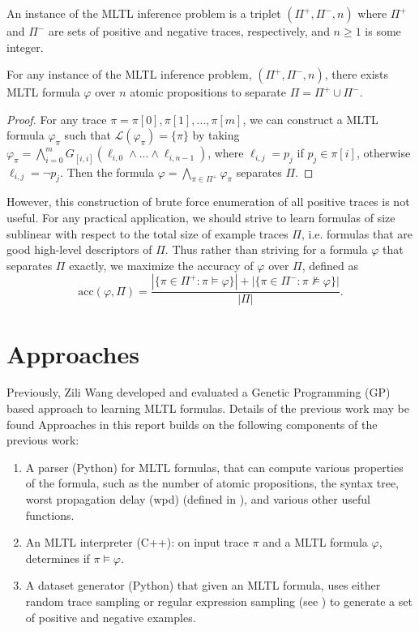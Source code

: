 \documentclass[runningheads]{llncs}
\renewcommand{\phi}{\varphi}
\begin{document}
\begin{definition}
    An instance of the MLTL inference problem is a triplet $(\Pi^+, \Pi^-, n)$ where $\Pi^+$ and $\Pi^-$ are sets of positive and negative traces, respectively, and $n \geq 1$ is some integer. 
\end{definition}
\begin{theorem}
    For any instance of the MLTL inference problem, $(\Pi^+, \Pi^-, n)$, there exists MLTL formula $\phi$ over $n$ atomic propositions to separate $\Pi = \Pi^+ \cup \Pi^-$. 
\end{theorem}
\begin{proof}
    For any trace $\pi = \pi[0],\pi[1],...,\pi[m]$, we can construct a MLTL formula $\phi_\pi$ such that $\mathcal{L}(\phi_\pi) = \{\pi\}$ by taking  $\phi_\pi = \bigwedge_{i = 0}^{m} G_{[i, i]}(\ell_{i,0} \land ... \land \ell_{i, n-1})$, where $\ell_{i, j} = p_j$ if $p_j \in \pi[i]$, otherwise $\ell_{i, j} = \neg p_j$. 
    Then the formula $\phi = \bigwedge_{\pi \in \Pi^+} \phi_\pi$ 
    separates $\Pi$.
\end{proof}

However, this construction of brute force enumeration of all positive traces is not useful. For any practical application, we should strive to learn formulas of size sublinear with respect to the total size of example traces $\Pi$, i.e. formulas that are good high-level descriptors of $\Pi$. Thus rather than striving for a formula $\phi$ that separates $\Pi$ exactly, we maximize the accuracy of $\phi$ over $\Pi$, defined as 
$$\text{acc}(\phi, \Pi) = 
\frac{|\{\pi \in \Pi^+ : \pi \vDash \phi\}| + |\{\pi \in \Pi^- : \pi \nvDash \phi\}|}{|\Pi|}.$$

\section{Approaches}
Previously, Zili Wang developed and evaluated a Genetic Programming (GP) based approach to learning MLTL formulas.
Details of the previous work may be found 
Approaches in this report builds on the following components of the previous work:
\begin{enumerate}
  \item A parser (Python) for MLTL formulas, that can compute various properties of the formula, such as the number of atomic propositions, the syntax tree, worst propagation delay (wpd) (defined in \cite{KZJZR20}), and various other useful functions.  
  \item An MLTL interpreter (C++): on input trace $\pi$ and a MLTL formula $\phi$, determines if $\pi \models \phi$.
  \item A dataset generator (Python) that given an MLTL formula, uses either random trace sampling or regular expression sampling (see \cite{WEST-iFM23}) to generate a set of positive and negative examples.
\end{enumerate}
\end{document}
